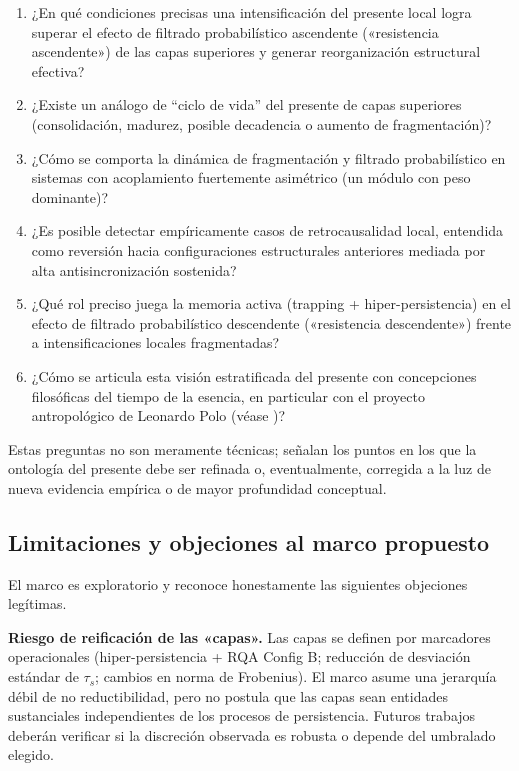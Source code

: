 \begin{enumerate}
    \item ¿En qué condiciones precisas una intensificación del presente local logra superar el efecto de filtrado probabilístico ascendente («resistencia ascendente») de las capas superiores y generar reorganización estructural efectiva?
    
    \item ¿Existe un análogo de ``ciclo de vida'' del presente de capas superiores (consolidación, madurez, posible decadencia o aumento de fragmentación)?
    
    \item ¿Cómo se comporta la dinámica de fragmentación y filtrado probabilístico en sistemas con acoplamiento fuertemente asimétrico (un módulo con peso dominante)?
    
    \item ¿Es posible detectar empíricamente casos de retrocausalidad local, entendida como reversión hacia configuraciones estructurales anteriores mediada por alta antisincronización sostenida?
    
    \item ¿Qué rol preciso juega la memoria activa (trapping + hiper-persistencia) en el efecto de filtrado probabilístico descendente («resistencia descendente») frente a intensificaciones locales fragmentadas?
    
    \item ¿Cómo se articula esta visión estratificada del presente con concepciones filosóficas del tiempo de la esencia, en particular con el proyecto antropológico de Leonardo Polo (véase \citep{polo_antropologia_trascendental,padilla_polo_dialogue_2026})?
\end{enumerate}

Estas preguntas no son meramente técnicas; señalan los puntos en los que la ontología del presente debe ser refinada o, eventualmente, corregida a la luz de nueva evidencia empírica o de mayor profundidad conceptual.

\subsection{Limitaciones y objeciones al marco propuesto}

El marco es exploratorio y reconoce honestamente las siguientes objeciones legítimas.

\textbf{Riesgo de reificación de las «capas».} Las capas se definen por marcadores operacionales (hiper-persistencia + RQA Config B; reducción de desviación estándar de $\tau_s$; cambios en norma de Frobenius). El marco asume una jerarquía débil de no reductibilidad, pero no postula que las capas sean entidades sustanciales independientes de los procesos de persistencia. Futuros trabajos deberán verificar si la discreción observada es robusta o depende del umbralado elegido.

